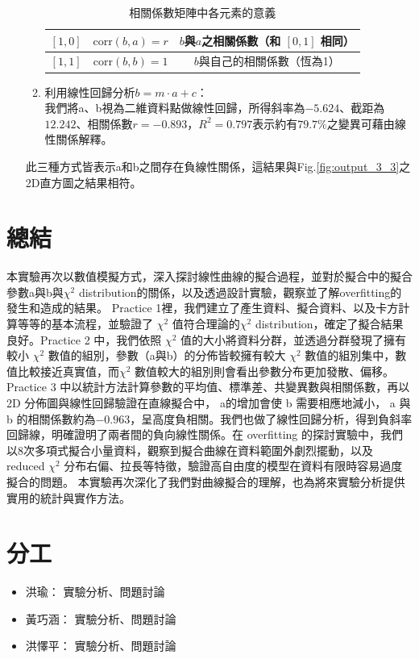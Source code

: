 \documentclass[12pt,a4paper]{article}
\begin{document}
\begin{CJK}{UTF8}{bkai}
\begin{itemize}
\begin{enumerate}
\begin{table}[h]
\begin{tabular}{|c|c|c|}
        \hline
        $[1, 0]$ & $\mathrm{corr}(b, a) = r$ & $b$與$a$之相關係數（和 $[0, 1]$ 相同） \\
        \hline
        $[1, 1]$ & $\mathrm{corr}(b, b) = 1$ & $b$與自己的相關係數（恆為1） \\
        \hline
    \end{tabular}
    \caption{相關係數矩陣中各元素的意義}
    \label{tab:corr_matrix}
\end{table}
        \item 利用線性回歸分析\textbf{$b=m\cdot a+c$}：\\我們將a、b視為二維資料點做線性回歸，所得斜率為$-5.624$、截距為$12.242$、相關係數$r=-0.893$，$R^2=0.797$表示約有$79.7\%$之變異可藉由線性關係解釋。
    \end{enumerate}
    此三種方式皆表示a和b之間存在負線性關係，這結果與Fig.\ref{fig:output_3_3}之2D直方圖之結果相符。
\end{itemize}




\section{總結}
\hfill

本實驗再次以數值模擬方式，深入探討線性曲線的擬合過程，並對於擬合中的擬合參數a與b與$\chi^2$ distribution的關係，以及透過設計實驗，觀察並了解overfitting的發生和造成的結果。 Practice 1裡，我們建立了產生資料、擬合資料、以及卡方計算等等的基本流程，並驗證了 $\chi^2$ 值符合理論的$\chi^2$ distribution，確定了擬合結果良好。Practice 2 中，我們依照 $\chi^2$ 值的大小將資料分群，並透過分群發現了擁有較小 $\chi^2$ 數值的組別，參數（a與b）的分佈皆較擁有較大 $\chi^2$ 數值的組別集中，數值比較接近真實值，而$\chi^2$ 數值較大的組別則會看出參數分布更加發散、偏移。Practice 3 中以統計方法計算參數的平均值、標準差、共變異數與相關係數，再以 2D 分佈圖與線性回歸驗證在直線擬合中， a的增加會使 b 需要相應地減小， a 與 b 的相關係數約為$-0.963$，呈高度負相關。我們也做了線性回歸分析，得到負斜率回歸線，明確證明了兩者間的負向線性關係。在 overfitting 的探討實驗中，我們以8次多項式擬合小量資料，觀察到擬合曲線在資料範圍外劇烈擺動，以及 reduced $\chi^2$ 分布右偏、拉長等特徵，驗證高自由度的模型在資料有限時容易過度擬合的問題。
本實驗再次深化了我們對曲線擬合的理解，也為將來實驗分析提供實用的統計與實作方法。



\section{分工}
\begin{itemize}
    \item 洪瑜： 實驗分析、問題討論
    \item 黃巧涵： 實驗分析、問題討論
    \item 洪懌平： 實驗分析、問題討論
\end{itemize}



\end{CJK}
\end{document}
